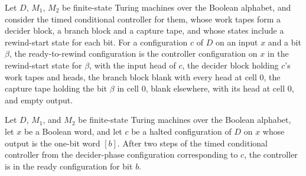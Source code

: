\begin{definition}
\label{Turing.FinTM.timedReadyCfg}
\leanok
{}
Let $D$, $M_1$, $M_2$ be finite-state Turing machines over the Boolean alphabet, and
consider the timed conditional controller for them, whose work tapes form a decider block,
a branch block and a capture tape, and whose states include a rewind-start state for
each bit. For a configuration $c$ of $D$ on an input $x$ and a bit $\beta$, the
ready-to-rewind configuration is the controller configuration on $x$ in the rewind-start
state for $\beta$, with the input head of $c$, the decider block holding $c$'s work tapes
and heads, the branch block blank with every head at cell $0$, the capture tape holding
the bit $\beta$ in cell $0$, blank elsewhere, with its head at cell $0$, and empty output.
\end{definition}

\begin{lemma}
\label{Turing.FinTM.timed_read}
\leanok
{}
Let $D$, $M_1$, and $M_2$ be finite-state Turing machines over the Boolean alphabet, let
$x$ be a Boolean word, and let $c$ be a halted configuration of $D$ on $x$ whose output
is the one-bit word $[b]$. After two steps of the timed conditional controller from the
decider-phase configuration corresponding to $c$, the controller is in the ready
configuration for bit $b$.
\end{lemma}

